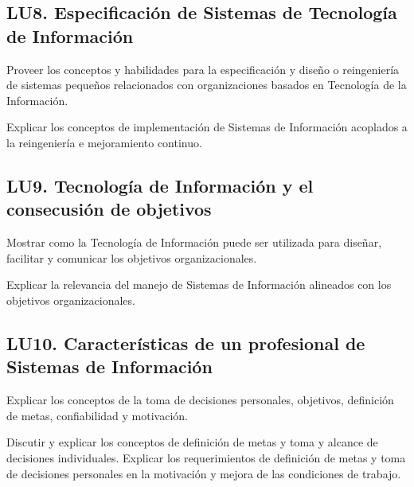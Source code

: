 \subsection{LU8. Especificación de Sistemas de Tecnología de Información}\label{sec:LU8}
\begin{LearningUnit}
\begin{LUGoal}
\item Proveer los conceptos y habilidades para la especificación y diseño o reingeniería de sistemas pequeños relacionados con organizaciones basados en Tecnología de la Información.
\end{LUGoal}

\begin{LUObjective}
\item Explicar los conceptos de implementación de Sistemas de Información acoplados a la reingeniería e mejoramiento continuo.
\end{LUObjective}
\end{LearningUnit}

\subsection{LU9. Tecnología de Información y el consecusión de objetivos}\label{sec:LU9}
\begin{LearningUnit}
\begin{LUGoal}
\item Mostrar como la Tecnología de Información puede ser utilizada para diseñar, facilitar y comunicar los objetivos organizacionales.
\end{LUGoal}

\begin{LUObjective}
\item Explicar la relevancia del manejo de Sistemas de Información alineados con los objetivos organizacionales.
\end{LUObjective}
\end{LearningUnit}

\subsection{LU10. Características de un profesional de Sistemas de Información}\label{sec:LU10}
\begin{LearningUnit}
\begin{LUGoal}
\item Explicar los conceptos de la toma de decisiones personales, objetivos, definición de metas, confiabilidad y motivación.
\end{LUGoal}

\begin{LUObjective}
\item Discutir y explicar los conceptos de definición de metas y toma y alcance de decisiones individuales. Explicar los requerimientos de definición de metas y toma de decisiones personales en la motivación y mejora de las condiciones de trabajo.
\end{LUObjective}
\end{LearningUnit}

